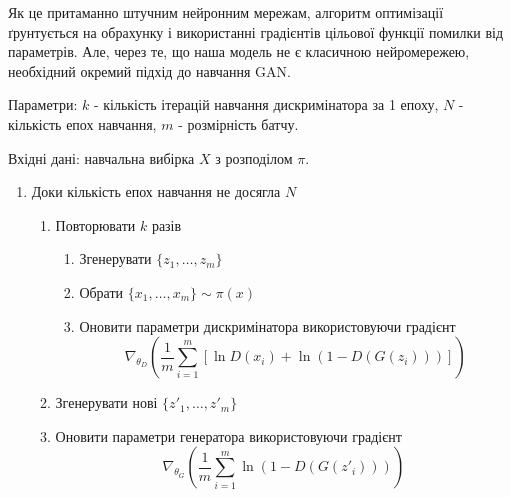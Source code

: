 Як це притаманно
штучним нейронним мережам, алгоритм оптимізації ґрунтується на
обрахунку і використанні градієнтів цільової функції помилки
від параметрів. Але, через те, що наша модель не є класичною
нейромережею, необхідний окремий підхід до навчання GAN.

\begin{algorithm}

    Параметри: $k$ - кількість ітерацій навчання дискримінатора за 1 епоху,
    $N$ - кількість епох навчання, $m$ - розмірність батчу.

    Вхідні дані: навчальна вибірка $X$ з розподілом $\pi$.

    \begin{enumerate}
        \item Доки кількість епох навчання не досягла $N$
              \begin{enumerate}
                  \item Повторювати $k$ разів
                        \begin{enumerate}[leftmargin=3.25cm]
                            \item Згенерувати $\{z_1, \dots, z_m\}$
                            \item Обрати $\{x_1, \dots, x_m\} \sim \pi(x)$
                            \item Оновити параметри дискримінатора використовуючи градієнт
                                  \begin{equation*}
                                      \nabla_{\theta_D} \left( \frac{1}{m}\sum\limits_{i=1}^m \left[
                                              \ln D(x_i) + \ln (1 - D(G(z_i))) \right] \right)
                                  \end{equation*}
                        \end{enumerate}
                  \item Згенерувати нові $\{z'_1, \dots, z'_m\}$\;
                  \item Оновити параметри генератора використовуючи градієнт
                        \begin{equation*}
                            \nabla_{\theta_G} \left( \frac{1}{m}\sum\limits_{i=1}^m
                            \ln (1 - D(G(z'_i))) \right)
                        \end{equation*}
              \end{enumerate}
    \end{enumerate}
\end{algorithm}

